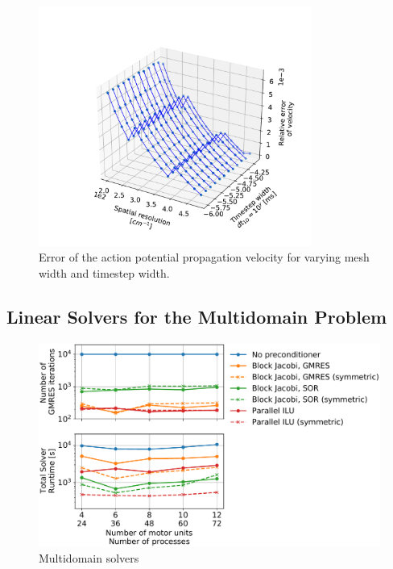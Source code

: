 
\begin{figure}
  \centering%
  \includegraphics[width=0.8\textwidth]{images/results/studies/hh_cn_error_propagation_velocity_3d.pdf}%
  \caption{Error of the action potential propagation velocity for varying mesh width and timestep width.}%
   \label{fig:hh_cn_error_propagation_velocity_3d}%
\end{figure}
\subsection{Linear Solvers for the Multidomain Problem}\label{sec:multidomain_solvers}

\begin{figure}[H]
  \centering%
  \includegraphics[width=\textwidth]{images/results/studies/multidomain_solvers_selected.pdf}%
  \caption{Multidomain solvers}%
  \label{fig:multidomain_solver}%
\end{figure}


